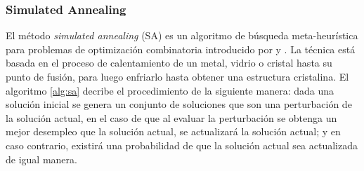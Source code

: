 \subsubsection{Simulated Annealing}
El método {\em simulated annealing} (SA) es un algoritmo de búsqueda meta-heurística para problemas de optimización combinatoria introducido por \cite{Kirkpatrick1983} y \cite{Cerny1985}. La técnica está basada en el proceso de calentamiento de un metal, vidrio o cristal hasta su punto de fusión, para luego enfriarlo hasta obtener una estructura cristalina. El algoritmo \ref{alg:sa} decribe el procedimiento de la siguiente manera: dada una solución inicial se genera un conjunto de soluciones que son una perturbación de la solución actual, en el caso de que al evaluar la perturbación se obtenga un mejor desempleo que la solución actual, se actualizará la solución actual; y en caso contrario, existirá una probabilidad de que la solución actual sea actualizada de igual manera.





